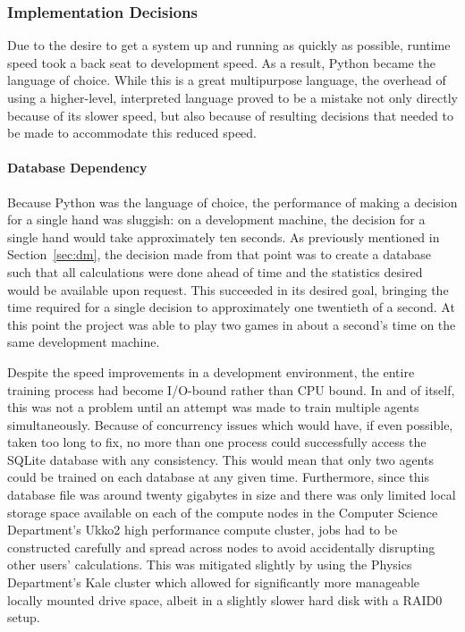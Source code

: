 
\subsubsection*{Implementation Decisions}
\label{sec:disc-future-implementation}

Due to the desire to get a system up and running as quickly as possible,
runtime speed took a back seat to development speed.
%
As a result,
Python became the language of choice.
%
While this is a great multipurpose language,
the overhead of using a higher-level, interpreted language
proved to be a mistake
not only directly because of its slower speed,
but also because of resulting decisions that needed to be made to accommodate
this reduced speed.


\paragraph*{Database Dependency}

Because Python was the language of choice,
the performance of making a decision for a single hand was sluggish:
on a development machine,
the decision for a single hand would take approximately ten seconds.
%
As previously mentioned in Section~\ref{sec:dm},
the decision made from that point was to create a database such that all
calculations were done ahead of time
and the statistics desired would be available upon request.
%
This succeeded in its desired goal,
bringing the time required for a single decision to approximately
one twentieth of a second.
%
At this point the project was able to play two games in about a second's time
on the same development machine.

Despite the speed improvements in a development environment,
the entire training process had become I/O-bound rather
than CPU bound.
%
In and of itself,
this was not a problem until an attempt was made to train multiple
agents simultaneously.
%
Because of concurrency issues which would have,
if even possible,
taken too long to fix,
no more than one process could successfully access the SQLite database with any
consistency.
%
This would mean that only two agents could be trained on each database at any
given time.
%
Furthermore,
since this database file was around twenty gigabytes in size and
there was only limited local storage space available
on each of the compute nodes in the Computer Science Department's Ukko2 high
performance compute cluster,
jobs had to be constructed carefully and spread across nodes to avoid
accidentally disrupting other users' calculations.
%
This was mitigated slightly by using the Physics Department's Kale cluster
which allowed for significantly more manageable locally mounted drive space,
albeit in a slightly slower hard disk with a RAID0 setup.


